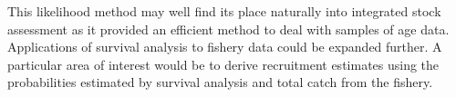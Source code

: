 




This likelihood method may well find its place naturally into integrated stock assessment \citep{Maunder201361} as it provided an efficient method to deal with samples of age data. Applications of survival analysis to fishery data could be expanded further. A particular area of interest would be to derive recruitment estimates using the probabilities estimated by survival analysis and total catch from the fishery.

